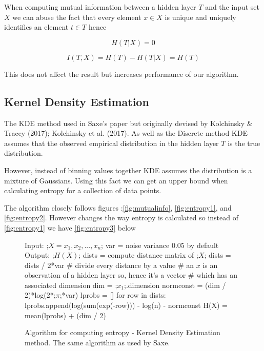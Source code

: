 When computing mutual information between a hidden layer $T$ and the input set
$X$ we can abuse the fact that every element $x\in X$ is unique and uniquely
identifies an element $t\in T$ hence 

\begin{equation}
  H(T|X) = 0 
\end{equation}

\begin{equation}
  I(T, X) = H(T) - H(T|X) = H(T) 
\end{equation}

This does not affect the result but increases performance of our algorithm.

\subsection{Kernel Density Estimation}

  The KDE method used in Saxe's paper but originally devised by Kolchinsky \&
  Tracey (2017); Kolchinsky et al. (2017). As well as the Discrete method KDE
  assumes that the observed empirical distribution in the hidden layer $T$ is
  the true distribution. 

  However, instead of binning values together KDE assumes the distribution is a
  mixture of Gaussians. Using this fact we can get an upper bound when
  calculating entropy for a collection of data points.

  The algorithm closely follows figures :\autoref{fig:mutualinfo},
  \autoref{fig:entropy1}, and \autoref{fig:entropy2}. However changes the way
  entropy is calculated so instead of \autoref{fig:entropy1} we have
  \autoref{fig:entropy3} below

\begin{figure}[H]
    \begin{pythonfigure}
      Input: 
      ;$X = x_1, x_2,...,x_n$;  
      var = noise variance 0.05 by default
      Output: ;$H(X)$;
      dists = compute distance matrix of ;$X$;
      dists = dists / 2*var # divide every distance by a value
      # an $x$ is an observation of a hidden layer so, hence it's a vector 
      # which has an associated dimension
      dim = ;$x_1$;.dimension
      normconst = (dim / 2)*log(2*;$\pi$;*var)
      lprobs = []
      for row in dists:
        lprobs.append(log(sum(exp(-row))) - log(n) - normconst
      H(X) = mean(lprobs) + (dim / 2)
    \end{pythonfigure}
    \caption{Algorithm for computing entropy - Kernel Density Estimation method.
    The same algorithm as used by Saxe.}
    \label{fig:entropy3}
\end{figure} 

